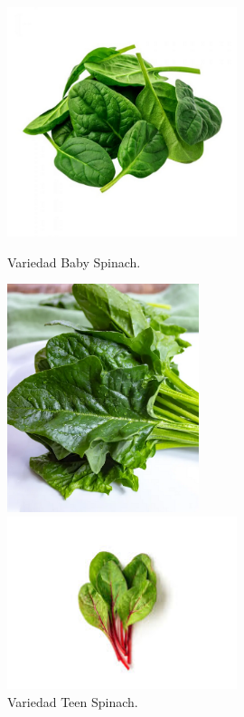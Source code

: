 \begin{figure}[ht!]
    \centering

    \begin{minipage}[b]{0.45\textwidth}
        \centering
        \includegraphics[width=0.6\textwidth]{img/baby_spinach.png}
        \caption{Variedad Baby Spinach.}
        \label{fig:baby}
    \end{minipage}
    \hfill
    \begin{minipage}[b]{0.45\textwidth}
        \centering
        \includegraphics[width=0.5\textwidth]{img/teen_spinach.png}
        \caption{Variedad Teen Spinach.}
        \label{fig:teen}
    \end{minipage}
    \begin{minipage}[b]{0.45\textwidth}
        \centering
        \includegraphics[width=0.6\textwidth]{img/red_spinach.jpg}

\end{minipage}
\end{figure}
